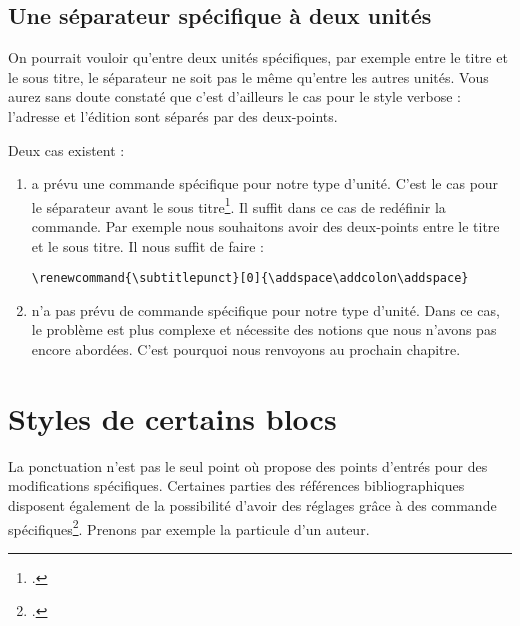 	
\subsection{Une séparateur spécifique à deux unités}
	
	On pourrait vouloir qu'entre deux unités spécifiques, par exemple entre le titre et le sous titre, le séparateur ne soit pas le même qu'entre les autres unités.	Vous aurez sans doute constaté que c'est d'ailleurs le cas pour le style verbose : l'adresse et l'édition sont séparés par des deux-points.
	
	Deux cas existent :
		\begin{enumerate}
			\item {} a prévu une commande spécifique pour notre type d'unité. C'est le cas pour le séparateur avant le sous titre\footcite[Ces commandes sont peu nombreuse : on les trouvera dans]{biblatex_hooks}. Il suffit dans ce cas de redéfinir la commande. Par exemple nous souhaitons avoir des deux-points entre le titre et le sous titre. Il nous suffit de faire :
			\begin{verbatim}
\renewcommand{\subtitlepunct}[0]{\addspace\addcolon\addspace}
			\end{verbatim}
			
			\item {} n'a pas prévu de commande spécifique pour notre type d'unité. Dans ce cas, le problème est plus complexe et nécessite des notions que nous n'avons pas encore abordées. C'est pourquoi nous renvoyons au prochain chapitre.
		\end{enumerate}

\section{Styles de certains blocs}

La ponctuation n'est pas le seul point où  propose des points d'entrés pour des modifications spécifiques. Certaines parties des références bibliographiques disposent également de la possibilité d'avoir des réglages grâce à des commande spécifiques\footcite{biblatex_hooks}. Prenons par exemple la particule d'un auteur.
	
	\begin{quotation}
	\cite{BeauvoirSexe}
	\end{quotation}
	
	\renewcommand{\mkbibnameprefix}[1]{\parentext{#1}}
	
